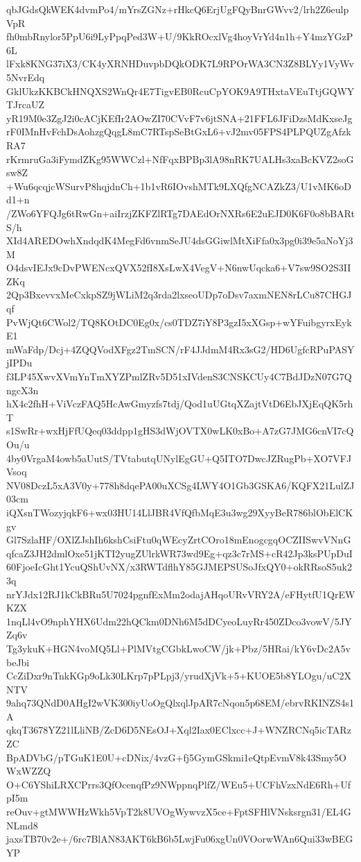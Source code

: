 qbJGdsQkWEK4dvmPo4/mYrsZGNz+rHkcQ6ErjUgFQyBnrGWvv2/lrh2Z6eulpVpR
fh0mbRnylor5PpU6i9LyPpqPed3W+U/9KkROcxlVg4hoyVrYd4n1h+Y4mzYGzP6L
lFxk8KNG37iX3/CK4yXRNHDuvpbDQkODK7L9RPOrWA3CN3Z8BLYy1VyWv5NvrEdq
GklUkzKKBCkHNQXS2WnQr4E7TigvEB0RcuCpYOK9A9THxtaVEuTtjGQWYTJrcaUZ
yR19M0e3ZgJ2i0cACjKEfIr2AOwZI70CVvF7v6jtSNA+21FFL6JFiDzsMdKxseJg
rF0IMnHvFchDsAohzgQqgL8mC7RTspSeBtGxL6+vJ2mv05FPS4PLPQUZgAfzkRA7
rKrmruGa3iFymdZKg95WWCzl+NfFqxBPBp3lA98nRK7UALHs3xaBcKVZ2soGsw8Z
+Wu6qcqjcWSurvP8hqjdnCh+1b1vR6IOvshMTk9LXQfgNCAZkZ3/U1vMK6oDd1+n
/ZWo6YFQJg6tRwGn+aiIrzjZKFZlRTg7DAEdOrNXRs6E2uEJD0K6F0o8bBARtS/h
XId4AREDOwhXndqdK4MegFd6vnmSeJU4dsGGiwlMtXiFfa0x3pg0i39e5aNoYj3M
O4dsvIEJx9cDvPWENcxQVX52fI8XsLwX4VegV+N6nwUqcka6+V7sw9SO2S3IIZKq
2Qp3BxevvxMeCxkpSZ9jWLiM2q3rda2lxseoUDp7oDsv7axmNEN8rLCu87CHGJqf
PvWjQt6CWol2/TQ8KOtDC0Eg0x/cs0TDZ7iY8P3gzI5xXGsp+wYFuibgyrxEykE1
mWaFdp/Dcj+4ZQQVodXFgz2TmSCN/rF4JJdmM4Rx3sG2/HD6UgfcRPuPASYjIPDu
f3LP45XwvXVmYnTmXYZPmlZRv5D51xIVdenS3CNSKCUy4C7BdJDzN07G7QngcX3n
hX4c2fhH+ViVczFAQ5HcAwGmyzfs7tdj/Qod1uUGtqXZajtVtD6EbJXjEqQK5rhT
s1SwRr+wxHjFfUQeq03ddpp1gHS3dWjOVTX0wLK0xBo+A7zG7JMG6cnVI7cQOu/u
4by0VrgaM4owb5aUutS/TVtabutqUNylEgGU+Q5ITO7DwcJZRugPb+XO7VFJVsoq
NV08DczL5xA3V0y+778h8dqePA00uXCSg4LWY4O1Gb3GSKA6/KQFX21LulZJ03cm
iQXsnTWozyjqkF6+wx03HU14LlJBR4VfQfbMqE3u3wg29XyyBeR786blObElCKgv
Gl7SzlaHF/OXlZJshIh6kshCsiFtu0qWEcyZrtCOro18mEnogcgqOCZIISwvVNnG
qfcaZ3JH2dmlOxe51jKTI2yugZUlrkWR73wd9Eg+qz3c7rMS+cR42Jp3ksPUpDuI
60FjoeIcGht1YcuQShUvNX/x3RWTdflhY85GJMEPSUSoJfxQY0+okRRsoS5uk23q
nrYJdx12RJ1kCkBRu5U7024pgnfExMm2odajAHqoURvVRY2A/eFHytfU1QrEWKZX
1nqLl4vO9nphYHX6Udm22hQCkm0DNh6M5dDCyeoLuyRr450ZDco3vowV/5JYZq6v
Tg3ykuK+HGN4voMQ5Ll+PlMVtgCGbkLwoCW/jk+Pbz/5HRai/kY6vDc2A5vbeJbi
CcZiDxr9nTnkKGp9oLk30LKrp7pPLpj3/yrudXjVk+5+KUOE5b8YLOgu/uC2XNTV
9ahq73QNdD0AHgI2wVK300iyUoOgQlxqlJpAR7cNqon5p68EM/ebrvRKINZS4s1A
qkqT3678YZ21lLliNB/ZcD6D5NEsOJ+Xql2Iax0EClxcc+J+WNZRCNq5icTARzZC
BpADVbG/pTGuK1E0U+cDNix/4vzG+fj5GymGSkmi1eQtpEvmV8k43Smy5OWxWZZQ
O+C6YShiLRXCPrrs3QfOcenqfPz9NWppnqPlfZ/WEu5+UCFhVzxNdE6Rh+UfpI5m
reOuv+gtMWWHzWkh5VpT2k8UVOgWywvzX5ce+FptSFHlVNsksrgn31/EL4GNLmd8
jaxsTB70v2e+/6rc7BlAN83AKT6kB6b5LwjFu06xgUn0VOorwWAn6Qui33wBEGYP
